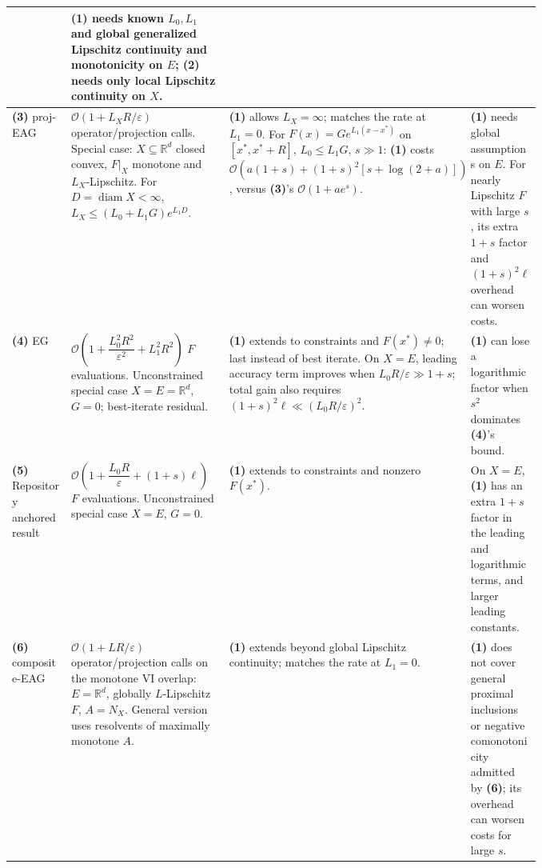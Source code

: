 \begin{table}[tp]
\begin{threeparttable}
\begin{tabularx}{\linewidth}{@{}>{\raggedright\arraybackslash}p{0.20\linewidth}>{\raggedright\arraybackslash}p{0.32\linewidth}>{\raggedright\arraybackslash}p{0.25\linewidth}>{\raggedright\arraybackslash}X@{}}
& \textbf{(1)} needs known $L_0,L_1$ and global generalized Lipschitz continuity and monotonicity on $E$; \textbf{(2)} needs only local Lipschitz continuity on $X$. \\
\midrule
\textbf{(3)} proj-EAG \citep[Thm.~E.4]{cohypCOZ2024v6}
& $\mathcal{O}(1+L_XR/\varepsilon)$ operator/projection calls. Special case: $X\subseteq\mathbb R^d$ closed convex, $F|_X$ monotone and $L_X$-Lipschitz. For $D=\operatorname{diam}X<\infty$, $L_X\le(L_0+L_1G)e^{L_1D}$.
& \textbf{(1)} allows $L_X=\infty$; matches the rate at $L_1=0$. For $F(x)=Ge^{L_1(x-x^*)}$ on $[x^*,x^*+R]$, $L_0\le L_1G$, $s\gg1$: \textbf{(1)} costs $\mathcal{O}(a(1+s)+(1+s)^2[s+\log(2+a)])$, versus \textbf{(3)}'s $\mathcal{O}(1+ae^s)$.
& \textbf{(1)} needs global assumptions on $E$. For nearly Lipschitz $F$ with large $s$, its extra $1+s$ factor and $(1+s)^2\ell$ overhead can worsen costs. \\
\midrule
\textbf{(4)} EG \citep[Thm.~3.6]{cgmChoudhury2025v1}
& $\mathcal{O}\!\left(1+\dfrac{L_0^2R^2}{\varepsilon^2}+L_1^2R^2\right)$ $F$ evaluations. Unconstrained special case $X=E=\mathbb R^d$, $G=0$; best-iterate residual.
& \textbf{(1)} extends to constraints and $F(x^*)\ne0$; last instead of best iterate. On $X=E$, leading accuracy term improves when $L_0R/\varepsilon\gg1+s$; total gain also requires $(1+s)^2\ell\ll(L_0R/\varepsilon)^2$.
& \textbf{(1)} can lose a logarithmic factor when $s^2$ dominates \textbf{(4)}'s bound. \\
\midrule
\textbf{(5)} Repository anchored result \citep{cgmRepositoryAnchored}
& $\mathcal{O}\!\left(1+\dfrac{L_0R}{\varepsilon}+(1+s)\ell\right)$ $F$ evaluations. Unconstrained special case $X=E$, $G=0$.
& \textbf{(1)} extends to constraints and nonzero $F(x^*)$.
& On $X=E$, \textbf{(1)} has an extra $1+s$ factor in the leading and logarithmic terms, and larger leading constants. \\
\midrule
\textbf{(6)} composite-EAG \citep[Thm.~3.2]{cohypCOZ2024v6}
& $\mathcal{O}(1+LR/\varepsilon)$ operator/projection calls on the monotone VI overlap: $E=\mathbb R^d$, globally $L$-Lipschitz $F$, $A=N_X$. General version uses resolvents of maximally monotone $A$.
& \textbf{(1)} extends beyond global Lipschitz continuity; matches the rate at $L_1=0$.
& \textbf{(1)} does not cover general proximal inclusions or negative comonotonicity admitted by \textbf{(6)}; its overhead can worsen costs for large $s$. \\
\bottomrule
\end{tabularx}
\begin{tablenotes}[flushleft]\footnotesize

\end{tablenotes}
\end{threeparttable}
\end{table}
